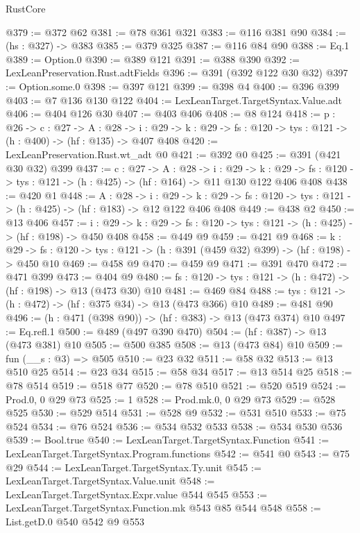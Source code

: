 \begin{lexlean}{RustCore}
\begin{coremodule}
@379 := @372 @62
@381 := @78 @361 @321
@383 := @116 @381 @90
@384 := (hs : @327) -> @383
@385 := @379 @325
@387 := @116 @84 @90
@388 := Eq.{1}
@389 := Option.{0}
@390 := @389 @121
@391 := @388 @390
@392 := LexLeanPreservation.Rust.adtFields
@396 := @391 (@392 @122 @30 @32)
@397 := Option.some.{0}
@398 := @397 @121
@399 := @398 @4
@400 := @396 @399
@403 := @7 @136 @130 @122
@404 := LexLeanTarget.TargetSyntax.Value.adt
@406 := @404 @126 @30
@407 := @403 @406
@408 := @8 @124
@418 := {p : @26} ->
  {c : @27} ->
  {A : @28} ->
  {i : @29} -> {k : @29} -> {fs : @120} -> {tys : @121} -> (h : @400) -> (hf : @135) -> @407 @408
@420 := LexLeanPreservation.Rust.wt_adt @0
@421 := @392 @0
@425 := @391 (@421 @30 @32) @399
@437 := {c : @27} ->
  {A : @28} ->
  {i : @29} ->
  {k : @29} -> {fs : @120} -> {tys : @121} -> (h : @425) -> (hf : @164) -> @11 @130 @122 @406 @408
@438 := @420 @1
@448 := {A : @28} ->
  {i : @29} ->
  {k : @29} -> {fs : @120} -> {tys : @121} -> (h : @425) -> (hf : @183) -> @12 @122 @406 @408
@449 := @438 @2
@450 := @13 @406
@457 := {i : @29} ->
  {k : @29} -> {fs : @120} -> {tys : @121} -> (h : @425) -> (hf : @198) -> @450 @408
@458 := @449 @9
@459 := @421 @9
@468 := {k : @29} ->
  {fs : @120} -> {tys : @121} -> (h : @391 (@459 @32) @399) -> (hf : @198) -> @450 @10
@469 := @458 @9
@470 := @459 @9
@471 := @391 @470
@472 := @471 @399
@473 := @404 @9
@480 := {fs : @120} -> {tys : @121} -> (h : @472) -> (hf : @198) -> @13 (@473 @30) @10
@481 := @469 @84
@488 := {tys : @121} -> (h : @472) -> (hf : @375 @34) -> @13 (@473 @366) @10
@489 := @481 @90
@496 := (h : @471 (@398 @90)) -> (hf : @383) -> @13 (@473 @374) @10
@497 := Eq.refl.{1}
@500 := @489 (@497 @390 @470)
@504 := (hf : @387) -> @13 (@473 @381) @10
@505 := @500 @385
@508 := @13 (@473 @84) @10
@509 := fun (__s : @3) => @505
@510 := @23 @32
@511 := @58 @32
@513 := @13 @510 @25
@514 := @23 @34
@515 := @58 @34
@517 := @13 @514 @25
@518 := @78 @514
@519 := @518 @77
@520 := @78 @510
@521 := @520 @519
@524 := Prod.{0, 0} @29 @73
@525 := 1
@528 := Prod.mk.{0, 0} @29 @73
@529 := @528 @525
@530 := @529 @514
@531 := @528 @9
@532 := @531 @510
@533 := @75 @524
@534 := @76 @524
@536 := @534 @532 @533
@538 := @534 @530 @536
@539 := Bool.true
@540 := LexLeanTarget.TargetSyntax.Function
@541 := LexLeanTarget.TargetSyntax.Program.functions
@542 := @541 @0
@543 := @75 @29
@544 := LexLeanTarget.TargetSyntax.Ty.unit
@545 := LexLeanTarget.TargetSyntax.Value.unit
@548 := LexLeanTarget.TargetSyntax.Expr.value @544 @545
@553 := LexLeanTarget.TargetSyntax.Function.mk @543 @85 @544 @548
@558 := List.getD.{0} @540 @542 @9 @553

\end{coremodule}
\end{lexlean}
